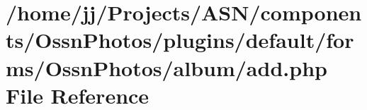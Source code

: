 \hypertarget{components_2_ossn_photos_2plugins_2default_2forms_2_ossn_photos_2album_2add_8php}{}\section{/home/jj/\+Projects/\+A\+S\+N/components/\+Ossn\+Photos/plugins/default/forms/\+Ossn\+Photos/album/add.php File Reference}
\label{components_2_ossn_photos_2plugins_2default_2forms_2_ossn_photos_2album_2add_8php}
